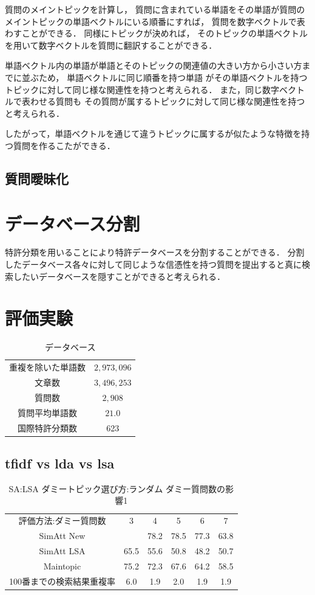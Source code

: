 \documentclass[master]{suribt}
\theoremstyle{definition}
\begin{document}
 質問のメイントピックを計算し，
 質問に含まれている単語をその単語が質問のメイントピックの単語ベクトルにいる順番にすれば，
 質問を数字ベクトルで表わすことができる．
 同様にトピックが決めれば，
 そのトピックの単語ベクトルを用いて数字ベクトルを質問に翻訳することができる．
 
 単語ベクトル内の単語が単語とそのトピックの関連値の大きい方から小さい方までに並ぶため，
 単語ベクトルに同じ順番を持つ単語
 がその単語ベクトルを持つトピックに対して同じ様な関連性を持つと考えられる．
 また，同じ数字ベクトルで表わせる質問も
 その質問が属するトピックに対して同じ様な関連性を持つと考えられる．
 
 したがって，単語ベクトルを通じて違うトピックに属するが似たような特徴を持つ質問を作るこたができる．
 
 
 \section{質問曖昧化}
 
 \chapter{データベース分割}
 特許分類を用いることにより特許データベースを分割することができる．
 分割したデータベース各々に対して同じような信憑性を持つ質問を提出すると真に検索したいデータベースを隠すことができると考えられる．

 \chapter{評価実験}

 \begin{table}[!hbp]
 \center
 \begin{tabular}{|c|c|}
 \hline
 重複を除いた単語数 & $2,973,096$  \\
 文章数 & $3,496,253$ \\
 質問数 & $2,908$ \\
 質問平均単語数 & $21.0$ \\
 国際特許分類数 & 623 \\
 \hline
 \end{tabular}
 \caption{データベース}
 \end{table}



 \section{tfidf vs lda vs lsa}
 \begin{table}[!hbp]
 \center
 \begin{tabular}{|c|c|c|c|c|c|}
 \hline
 評価方法:ダミー質問数  & 3 & 4 & 5 & 6 & 7    \\
 SimAtt New &  & 78.2 & 78.5 & 77.3 & 63.8 \\
 SimAtt LSA & 65.5 &55.6 & 50.8 & 48.2 & 50.7 \\
 Maintopic & 75.2 & 72.3 & 67.6 & 64.2 & 58.5 \\
 100番までの検索結果重複率 & 6.0 & 1.9 & 2.0 & 1.9 & 1.9 \\
 \hline
 \end{tabular}
 \caption{SA:LSA ダミートピック選び方:ランダム ダミー質問数の影響1}
 \end{table}
\end{document}
